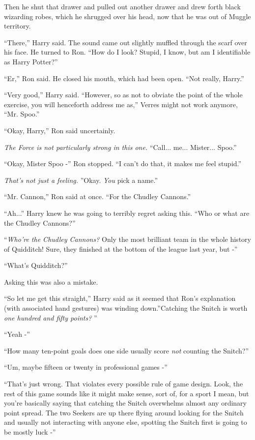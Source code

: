 Then he shut that drawer and pulled out another drawer and drew forth
black wizarding robes, which he shrugged over his head, now that he was
out of Muggle territory.

``There,'' Harry said. The sound came out slightly muffled through the
scarf over his face. He turned to Ron. ``How do I look? Stupid, I know,
but am I identifiable as Harry Potter?''

``Er,'' Ron said. He closed his mouth, which had been open. ``Not
really, Harry.''

``Very good,'' Harry said. ``However, so as not to obviate the point of
the whole exercise, you will henceforth address me as,'' Verres might
not work anymore, ``Mr. Spoo.''

``Okay, Harry,'' Ron said uncertainly.

\emph{The Force is not particularly strong in this one.} ``Call...
me... Mister... Spoo.''

``Okay, Mister Spoo -'' Ron stopped. ``I can't do that, it makes me feel
stupid.''

\emph{That's not just a feeling.} ''Okay. \emph{You} pick a name.''

``Mr. Cannon,'' Ron said at once. ``For the Chudley Cannons.''

``Ah...'' Harry knew he was going to terribly regret asking this.
``Who or what are the Chudley Cannons?''

``\emph{Who're the Chudley Cannons?} Only the most brilliant team in the
whole history of Quidditch! Sure, they finished at the bottom of the
league last year, but -''

``What's Quidditch?''

Asking this was also a mistake.

``So let me get this straight,'' Harry said as it seemed that Ron's
explanation (with associated hand gestures) was winding down.''Catching
the Snitch is worth \emph{one hundred and fifty points?} ''

``Yeah -''

``How many ten-point goals does one side usually score \emph{not}
counting the Snitch?''

``Um, maybe fifteen or twenty in professional games -''

``That's just wrong. That violates every possible rule of game design.
Look, the rest of this game sounds like it might make sense, sort of,
for a sport I mean, but you're basically saying that catching the Snitch
overwhelms almost any ordinary point spread. The two Seekers are up
there flying around looking for the Snitch and usually not interacting
with anyone else, spotting the Snitch first is going to be mostly luck
-''

